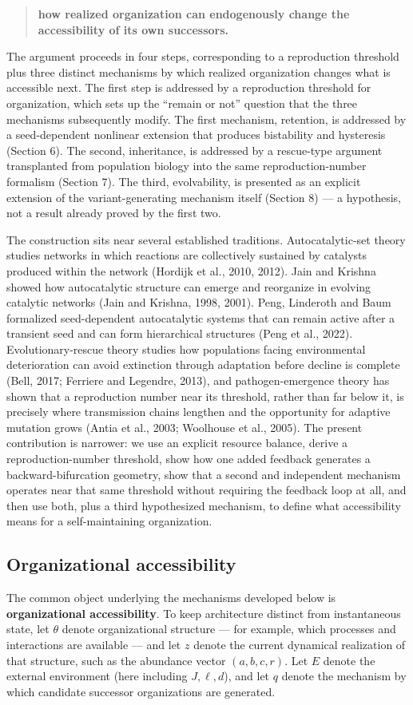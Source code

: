 \documentclass[11pt]{article}
\begin{document}
\begin{quote}
\textbf{how realized organization can endogenously change the
accessibility of its own successors.}
\end{quote}

The argument proceeds in four steps, corresponding to a reproduction
threshold plus three distinct mechanisms by which realized organization
changes what is accessible next. The first step is addressed by a
reproduction threshold for organization, which sets up the ``remain or
not'' question that the three mechanisms subsequently modify. The first
mechanism, retention, is addressed by a seed-dependent nonlinear
extension that produces bistability and hysteresis (Section 6). The
second, inheritance, is addressed by a rescue-type argument transplanted
from population biology into the same reproduction-number formalism
(Section 7). The third, evolvability, is presented as an explicit
extension of the variant-generating mechanism itself (Section 8) --- a
hypothesis, not a result already proved by the first two.

The construction sits near several established traditions.
Autocatalytic-set theory studies networks in which reactions are
collectively sustained by catalysts produced within the network (Hordijk
et al., 2010, 2012). Jain and Krishna showed how autocatalytic structure
can emerge and reorganize in evolving catalytic networks (Jain and
Krishna, 1998, 2001). Peng, Linderoth and Baum formalized seed-dependent
autocatalytic systems that can remain active after a transient seed and
can form hierarchical structures (Peng et al., 2022).
Evolutionary-rescue theory studies how populations facing environmental
deterioration can avoid extinction through adaptation before decline is
complete (Bell, 2017; Ferriere and Legendre, 2013), and
pathogen-emergence theory has shown that a reproduction number near its
threshold, rather than far below it, is precisely where transmission
chains lengthen and the opportunity for adaptive mutation grows (Antia
et al., 2003; Woolhouse et al., 2005). The present contribution is
narrower: we use an explicit resource balance, derive a
reproduction-number threshold, show how one added feedback generates a
backward-bifurcation geometry, show that a second and independent
mechanism operates near that same threshold without requiring the
feedback loop at all, and then use both, plus a third hypothesized
mechanism, to define what accessibility means for a self-maintaining
organization.

\subsection{Organizational
accessibility}
The common object underlying the mechanisms developed below is
\textbf{organizational accessibility}. To keep architecture distinct
from instantaneous state, let \(\theta\) denote organizational structure
--- for example, which processes and interactions are available --- and
let \(z\) denote the current dynamical realization of that structure,
such as the abundance vector \((a,b,c,r)\). Let \(E\) denote the
external environment (here including \(J,\ell,d\)), and let \(q\) denote
the mechanism by which candidate successor organizations are generated.
\end{document}
